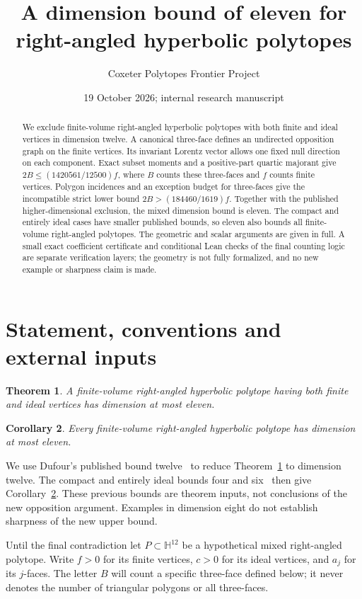 \documentclass[11pt]{article}
\title{A dimension bound of eleven for right-angled hyperbolic polytopes}
\author{Coxeter Polytopes Frontier Project}
\date{19 October 2026; internal research manuscript}
\newtheorem{theorem}{Theorem}[section]
\newtheorem{corollary}[theorem]{Corollary}
\newcommand{\HH}{\mathbb H}
\begin{document}
\maketitle
\begin{abstract}
We exclude finite-volume right-angled hyperbolic polytopes with both
finite and ideal vertices in dimension twelve. A canonical
three-face defines an undirected opposition graph on the finite
vertices. Its invariant Lorentz vector allows one fixed null direction
on each component. Exact subset moments and a positive-part quartic
majorant give $2B\le(1420561/12500)f$, where $B$ counts these
three-faces and $f$ counts finite vertices. Polygon incidences and an
exception budget for three-faces give the incompatible strict lower
bound $2B>(184460/1619)f$. Together with the published higher-dimensional
exclusion, the mixed dimension bound is eleven. The compact and entirely
ideal cases have smaller published bounds, so eleven also bounds all
finite-volume right-angled polytopes. The geometric and scalar arguments
are given in full. A small exact coefficient certificate and conditional
Lean checks of the final counting logic are separate verification layers;
the geometry is not fully formalized, and no new example or sharpness
claim is made.
\end{abstract}

\section{Statement, conventions and external inputs}
\begin{theorem}\label{thm:main}
A finite-volume right-angled hyperbolic polytope having both finite
and ideal vertices has dimension at most eleven.
\end{theorem}
\begin{corollary}\label{cor:all}
Every finite-volume right-angled hyperbolic polytope has dimension
at most eleven.
\end{corollary}
We use Dufour's published bound twelve~\cite{Dufour} to reduce
Theorem~\ref{thm:main} to dimension twelve. The compact and entirely
ideal bounds four and six~\cite{PV,Kolpakov} then give
Corollary~\ref{cor:all}. These previous bounds are theorem inputs,
not conclusions of the new opposition argument. Examples in dimension
eight do not establish sharpness of the new upper bound.

Until the final contradiction let $P\subset\HH^{12}$ be a hypothetical
mixed right-angled polytope. Write $f>0$ for its finite vertices,
$c>0$ for its ideal vertices, and $a_j$ for its $j$-faces. The
letter $B$ will count a specific three-face defined below; it never
denotes the number of triangular polygons or all three-faces.
\end{document}
